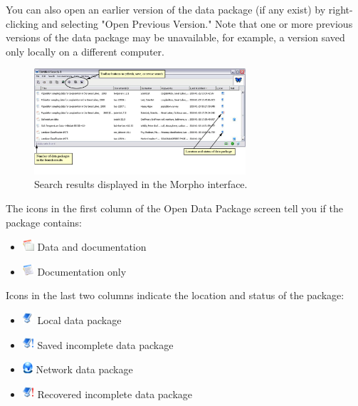 You can also open an earlier version of the data package (if any exist)
by right-clicking and selecting "Open Previous Version." Note that one
or more previous versions of the data package may be unavailable, for
example, a version saved only locally on a different computer.

\begin{figure}
  \centering
    \includegraphics[width=0.7\textwidth]{images/search-results.jpg}
  \caption{Search results displayed in the Morpho interface.}
  \label{fig:search-results}
\end{figure}

The icons in the first column of the Open Data Package screen tell you
if the package contains:
\begin{itemize}
  \parskip 3pt
  \itemsep 0pt
  \item[] \includegraphics[scale=0.7]{images/indicator-hasdata.png}
    Data and documentation
  \item[] \includegraphics[scale=0.7]{images/indicator-hasnodata.png}
	Documentation only 
\end{itemize}

Icons in the last two columns indicate the location and status of the
package:
\begin{itemize}
  \parskip 3pt
  \itemsep 0pt
  \item[] \includegraphics[scale=0.7]{images/indicator-dp-local.png}
  Local data package
  \item[] \includegraphics[scale=0.7]{images/indicator-dp-incomplete.png}
  Saved incomplete data package
  \item[] \includegraphics[scale=0.7]{images/indicator-dp-network.png}
  Network data package
  \item[] \includegraphics[scale=0.7]{images/indicator-dp-recovered.png}
  Recovered incomplete data package
\end{itemize}

